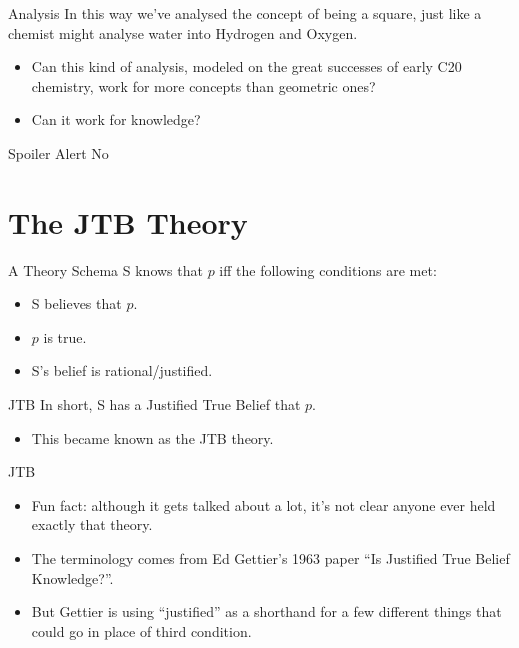 \documentclass[
  17pt,
  letterpaper,
  ignorenonframetext,
  aspectratio=169,
]{beamer}
\providecommand{\tightlist}{%
  \setlength{\itemsep}{0pt}\setlength{\parskip}{0pt}}\usepackage{longtable,booktabs,array}
\begin{document}
\begin{frame}{Analysis}
\protect\hypertarget{analysis-1}{}
In this way we've analysed the concept of being a square, just like a
chemist might analyse water into Hydrogen and Oxygen.

\begin{itemize}[<+->]
\tightlist
\item
  Can this kind of analysis, modeled on the great successes of early C20
  chemistry, work for more concepts than geometric ones?
\item
  Can it work for knowledge?
\end{itemize}
\end{frame}

\begin{frame}{Spoiler Alert}
\protect\hypertarget{spoiler-alert}{}
No
\end{frame}

\hypertarget{the-jtb-theory}{%
\section{The JTB Theory}\label{the-jtb-theory}}

\begin{frame}{A Theory Schema}
\protect\hypertarget{a-theory-schema}{}
S knows that \(p\) iff the following conditions are met:

\begin{itemize}[<+->]
\tightlist
\item
  S believes that \(p\).
\item
  \(p\) is true.
\item
  S's belief is rational/justified.
\end{itemize}
\end{frame}

\begin{frame}{JTB}
\protect\hypertarget{jtb}{}
In short, S has a Justified True Belief that \(p\).

\begin{itemize}[<+->]
\tightlist
\item
  This became known as the JTB theory.
\end{itemize}
\end{frame}

\begin{frame}{JTB}
\protect\hypertarget{jtb-1}{}
\begin{itemize}[<+->]
\tightlist
\item
  Fun fact: although it gets talked about a lot, it's not clear anyone
  ever held exactly that theory.
\item
  The terminology comes from Ed Gettier's 1963 paper ``Is Justified True
  Belief Knowledge?''.
\item
  But Gettier is using ``justified'' as a shorthand for a few different
  things that could go in place of third condition.
\end{itemize}
\end{frame}
\end{document}
